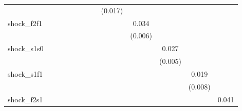 {\begin{tabular}{l*{12}{c}}
            &                     &                     &                     &                     &                     &                     &                     &     (0.017)         &                     &                     &                     &                     \\
\addlinespace
shock\_f2f1  &                     &                     &                     &                     &                     &                     &                     &                     &       0.034\sym{***}&                     &                     &                     \\
            &                     &                     &                     &                     &                     &                     &                     &                     &     (0.006)         &                     &                     &                     \\
\addlinespace
shock\_s1s0  &                     &                     &                     &                     &                     &                     &                     &                     &                     &       0.027\sym{***}&                     &                     \\
            &                     &                     &                     &                     &                     &                     &                     &                     &                     &     (0.005)         &                     &                     \\
\addlinespace
shock\_s1f1  &                     &                     &                     &                     &                     &                     &                     &                     &                     &                     &       0.019\sym{**} &                     \\
            &                     &                     &                     &                     &                     &                     &                     &                     &                     &                     &     (0.008)         &                     \\
\addlinespace
shock\_f2s1  &                     &                     &                     &                     &                     &                     &                     &                     &                     &                     &                     &       0.041\sym{***}\\

\end{tabular}}
